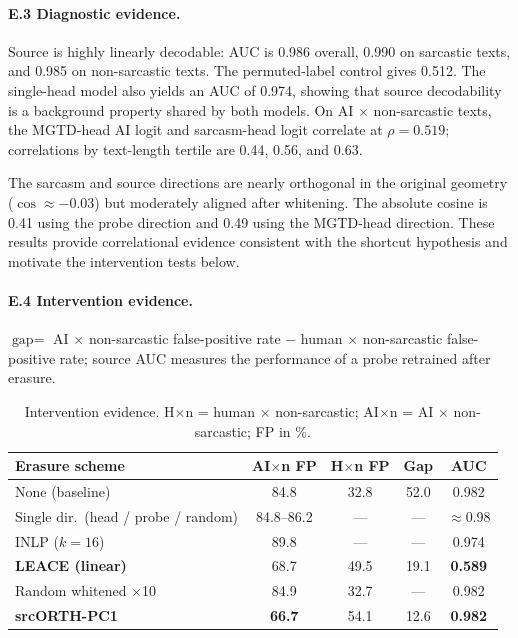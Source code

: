 \paragraph{E.3 Diagnostic evidence.} Source is highly linearly decodable: AUC is 0.986 overall, 0.990 on sarcastic texts, and 0.985 on non-sarcastic texts. The permuted-label control gives 0.512. The single-head model also yields an AUC of 0.974, showing that source decodability is a background property shared by both models. On AI $\times$ non-sarcastic texts, the MGTD-head AI logit and sarcasm-head logit correlate at $\rho = 0.519$; correlations by text-length tertile are 0.44, 0.56, and 0.63.

The sarcasm and source directions are nearly orthogonal in the original geometry ($\cos \approx -0.03$) but moderately aligned after whitening. The absolute cosine is 0.41 using the probe direction and 0.49 using the MGTD-head direction. These results provide correlational evidence consistent with the shortcut hypothesis and motivate the intervention tests below.

\paragraph{E.4 Intervention evidence.} $\text{gap} =$ AI $\times$ non-sarcastic false-positive rate $-$ human $\times$ non-sarcastic false-positive rate; source AUC measures the performance of a probe retrained after erasure.

\begin{table}[h]
  \centering
  \small
  \setlength{\tabcolsep}{3.5pt}
  \begin{tabular}{@{}p{2.25cm}cccc@{}}
    \toprule
    \textbf{Erasure scheme} & \textbf{AI$\times$n FP} & \textbf{H$\times$n FP} & \textbf{Gap} & \textbf{AUC} \\
    \midrule
    None (baseline) & 84.8 & 32.8 & 52.0 & 0.982 \\
    Single dir.\ (head / probe / random) & 84.8--86.2 & --- & --- & $\approx$0.98 \\
    INLP ($k = 16$) & 89.8 & --- & --- & 0.974 \\
    \textbf{LEACE (linear)} & 68.7 & 49.5 & 19.1 & \textbf{0.589} \\
    Random whitened $\times$10 & 84.9 & 32.7 & --- & 0.982 \\
    \textbf{srcORTH-PC1} & \textbf{66.7} & 54.1 & 12.6 & \textbf{0.982} \\
    \bottomrule
  \end{tabular}
  \caption{Intervention evidence. H$\times$n = human $\times$ non-sarcastic; AI$\times$n = AI $\times$ non-sarcastic; FP in \%.}
  \label{tab:intervention}
\end{table}

